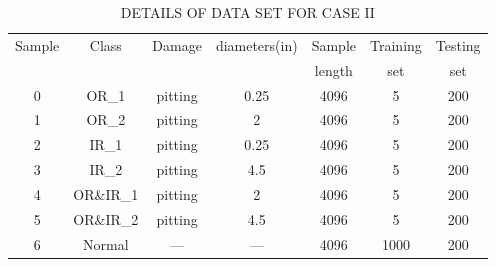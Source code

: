 \begin{table}[htbp]
\centering
\caption{DETAILS OF DATA SET FOR CASE II}
\label{tab:dataset_caseII}
\begin{tabular}{ccccccc}
\toprule
Sample & Class & Damage & diameters(in) & Sample & Training & Testing \\
 & & & & length & set & set \\
\midrule
0 & OR\_1 & pitting & 0.25 & 4096 & 5 & 200 \\
1 & OR\_2 & pitting & 2 & 4096 & 5 & 200 \\
2 & IR\_1 & pitting & 0.25 & 4096 & 5 & 200 \\
3 & IR\_2 & pitting & 4.5 & 4096 & 5 & 200 \\
4 & OR\&IR\_1 & pitting & 2 & 4096 & 5 & 200 \\
5 & OR\&IR\_2 & pitting & 4.5 & 4096 & 5 & 200 \\
6 & Normal & --- & --- & 4096 & 1000 & 200 \\
\bottomrule
\end{tabular}
\end{table}
